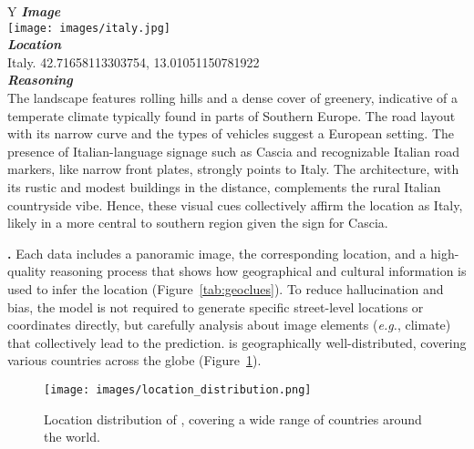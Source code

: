 \begin{table*}[htbp]
\begin{tabularx}{\linewidth}{Y}
    \toprule 
        \textit{\textbf{Image}} \\
        \texttt{[image: images/italy.jpg]} \\
        \midrule
        \textit{\textbf{Location}} \\
        Italy. 42.71658113303754, 13.01051150781922 \\
        \midrule
        \textit{\textbf{Reasoning}} \\
        The landscape features rolling hills and a dense cover of greenery, indicative of a temperate climate typically found in parts of Southern Europe. The road layout with its narrow curve and the types of vehicles suggest a European setting. The presence of Italian-language signage such as Cascia and recognizable Italian road markers, like narrow front plates, strongly points to Italy. The architecture, with its rustic and modest buildings in the distance, complements the rural Italian countryside vibe. Hence, these visual cues collectively affirm the location as Italy, likely in a more central to southern region given the sign for Cascia. \\
    \bottomrule
\end{tabularx}
\caption{
Demonstration of \dataname.
}
\label{tab:geoclues}
\end{table*}

\textbf{\dataname.} 
Each data includes a panoramic image, the corresponding location, and a high-quality reasoning process that shows how geographical and cultural information is used to infer the location (Figure~\ref{tab:geoclues}). To reduce hallucination and bias, the model is not required to generate specific street-level locations or coordinates directly, but carefully analysis about image elements (\textit{e.g.}, climate) that collectively lead to the prediction. \dataname is geographically well-distributed, covering various countries across the globe (Figure~\ref{fig:location_distribution}).

\begin{figure}[htb]
    \centering
    \texttt{[image: images/location\_distribution.png]} 
    \caption{Location distribution of \dataname, covering a wide range of countries around the world.}
    \label{fig:location_distribution}
\end{figure}

